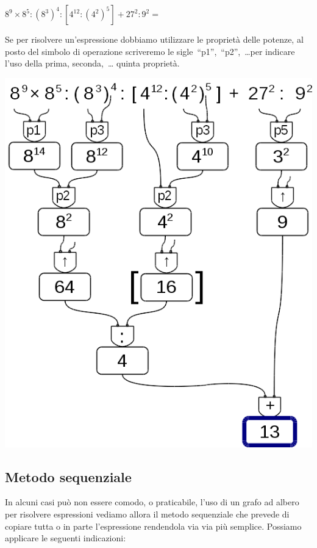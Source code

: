  \begin{esempio}
  \(8^9 \times 8^5 : (8^3)^4 : [4^{12} : (4^2)^5] + 27^2 : 9^2 =\)
  
  Se per risolvere un'espressione dobbiamo utilizzare le proprietà delle 
  potenze, al posto del simbolo di operazione scriveremo le 
  sigle~``p1'',~``p2'',~\dots per indicare l'uso della prima, seconda,~\dots
  quinta proprietà.
  
\begin{inaccessibleblock}[]
 \begin{center}
  \includegraphics[scale=0.35]{img/op_espr_pot.png}
 \end{center}
\end{inaccessibleblock}
 \end{esempio}

\subsection{Metodo sequenziale}

In alcuni casi può non essere comodo, o praticabile, l'uso di un grafo ad 
albero per risolvere espressioni vediamo allora il metodo sequenziale che
prevede di copiare tutta o in parte l'espressione rendendola via via più 
semplice. Possiamo applicare le seguenti indicazioni:

